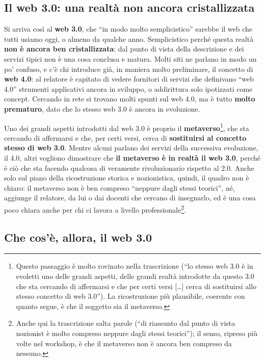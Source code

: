 \subsection{Il web 3.0: una realtà non ancora cristallizzata}

Si arriva così al \textbf{web 3.0}, che ``in modo molto semplicistico'' sarebbe
il web che tutti usiamo oggi, o almeno da qualche anno. Semplicistico perché
questa realtà \textbf{non è ancora ben cristallizzata}: dal punto di vista della
descrizione e dei servizi tipici non è una cosa conclusa e matura. Molti siti ne
parlano in modo un po' confuso, e c'è chi introduce già, in maniera molto
preliminare, il concetto di \textbf{web 4.0}: al relatore è capitato di vedere
fornitori di servizi che definivano ``web 4.0'' strumenti applicativi ancora in
sviluppo, o addirittura solo ipotizzati come concept. Cercando in rete si
trovano molti spunti sul web 4.0, ma è tutto \textbf{molto prematuro}, dato che
lo stesso web 3.0 è ancora in evoluzione.

Uno dei grandi aspetti introdotti dal web 3.0 è proprio il
\textbf{metaverso}\footnote{Questo passaggio è molto rovinato nella trascrizione
(``lo stesso web 3.0 è in evoletti uno delle grandi aspetti, delle grandi realtà
introdotte da questo 3.0 che sta cercando di affermarsi e che per certi versi
[\dots] cerca di sostituirsi allo stesso concetto di web 3.0''). La ricostruzione
più plausibile, coerente con quanto segue, è che il soggetto sia il metaverso.},
che sta cercando di affermarsi e che, per certi versi, cerca di
\textbf{sostituirsi al concetto stesso di web 3.0}. Mentre alcuni parlano dei
servizi della successiva evoluzione, il 4.0, altri vogliono dimostrare che
\textbf{il metaverso è in realtà il web 3.0}, perché è ciò che sta facendo
qualcosa di veramente rivoluzionario rispetto al 2.0. Anche solo sul piano della
ricostruzione storica e nozionistica, quindi, il quadro non è chiaro: il
metaverso non è ben compreso ``neppure dagli stessi teorici'', né, aggiunge il
relatore, da lui o dai docenti che cercano di insegnarlo, ed è una cosa poco
chiara anche per chi ci lavora a livello professionale\footnote{Anche qui la
trascrizione salta parole (``di riassunto dal punto di vista nozionist è molto
compreso neppure dagli stessi teorici''); il senso, ripreso più volte nel
workshop, è che il metaverso non è ancora ben compreso da nessuno.}.

\subsection{Che cos'è, allora, il web 3.0}

